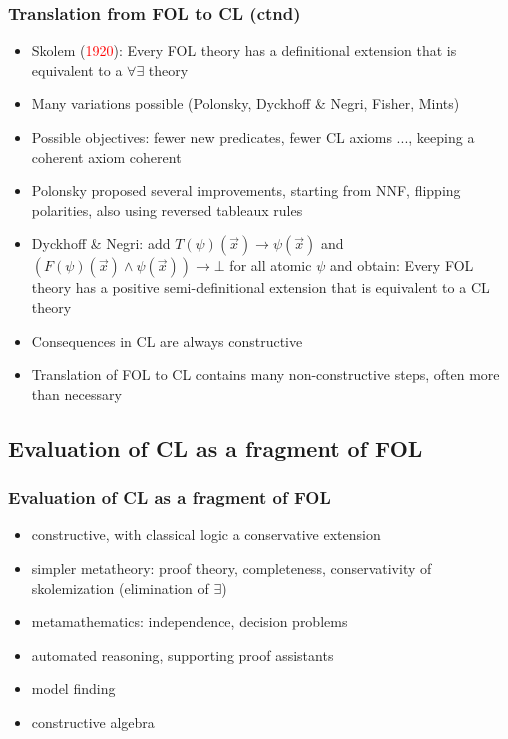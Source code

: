 \documentclass[handout,11pt]{beamer}
\newcommand{\red}[1]{\textcolor{red}{#1}}
\begin{document}
\begin{frame}
\frametitle{Translation from FOL to CL (ctnd)}
 \begin{itemize}[<+->]
   \item Skolem (\red{1920}): Every FOL theory has a definitional 
   extension that is equivalent to a $\forall\exists$ theory
   \item Many variations possible (Polonsky, Dyckhoff \& Negri, Fisher, Mints)
   \item Possible objectives: fewer new predicates, fewer CL axioms ...,
   keeping a coherent axiom coherent
   \item Polonsky proposed several improvements, starting from NNF,
   flipping polarities, also using reversed tableaux rules
   \item Dyckhoff \& Negri: add $T(\psi)(\vec{x}) \to \psi(\vec{x})$ 
   and $(F(\psi)(\vec{x})\wedge \psi(\vec{x})) \to \bot$
   for all atomic $\psi$ and obtain:
   Every FOL theory has a positive semi-definitional extension 
   that is equivalent to a CL theory
   \item Consequences in CL are always constructive
   \item Translation of FOL to CL contains many non-constructive steps,
   often more than necessary
 \end{itemize}
\end{frame}

\subsection{Evaluation of CL as a fragment of FOL}

\begin{frame}
\frametitle{Evaluation of CL as a fragment of FOL}
 \begin{itemize}[<+->]   %
    \item constructive, with classical logic a conservative extension
    \item simpler metatheory: proof theory, completeness, 
    conservativity of skolemization (elimination of $\exists$)
    \item metamathematics: independence, decision problems
    \item automated reasoning, supporting proof assistants    
    \item model finding
    \item constructive algebra
 \end{itemize}
\end{frame}
\end{document}
